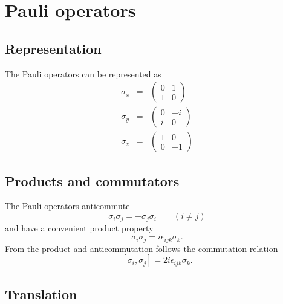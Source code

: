 \section{Pauli operators}

\subsection{Representation}
The Pauli operators can be represented as \begin{eqnarray}
\sigma_x &=& \left( \begin{array}{cc} 0 & 1 \\ 1 & 0 \end{array} \right) \\
\sigma_y &=& \left( \begin{array}{cc} 0 & -i \\ i & 0 \end{array} \right) \\
\sigma_z &=& \left( \begin{array}{cc} 1 & 0 \\ 0 & -1 \end{array} \right) \end{eqnarray}

\subsection{Products and commutators}
The Pauli operators anticommute \begin{equation}
\sigma_i \sigma_j = - \sigma_j \sigma_i \qquad (i \neq j) \end{equation}
and have a convenient product property \begin{equation}
\sigma_i \sigma_j = i \epsilon_{ijk} \sigma_k. \end{equation}
From the product and anticommutation follows the commutation relation \begin{equation}
\left[ \sigma_i, \sigma_j \right] = 2i \epsilon_{ijk} \sigma_k. \end{equation}

\subsection{Translation}

